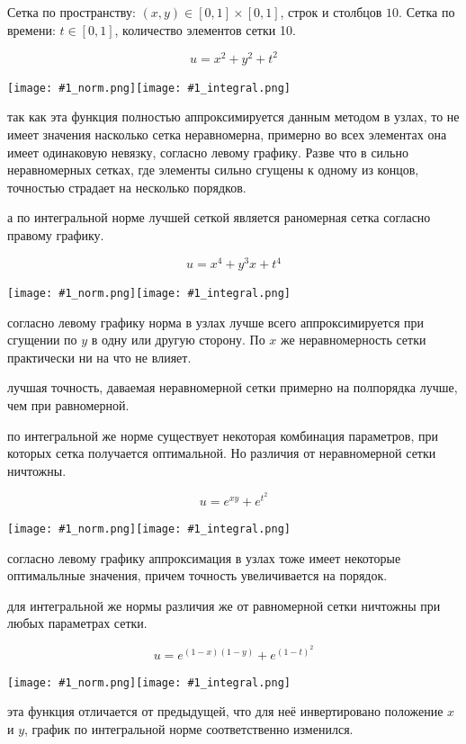 Сетка по пространству: $ (x, y) \in [0, 1] \times [0, 1] $, строк и столбцов $10$. Сетка по времени: $ t \in [0, 1] $, количество элементов сетки 10.

\newcommand{\includetwoimages}[1]{
\noindent\texttt{[image: \#1\_norm.png]}\texttt{[image: \#1\_integral.png]}
}

$$ u = x^2 + y^2 + t^2 $$

\includetwoimages{space_tgrid_0}

\conclusion так как эта функция полностью аппроксимируется данным методом в узлах, то не имеет значения насколько сетка неравномерна, примерно во всех элементах она имеет одинаковую невязку, согласно левому графику. Разве что в сильно неравномерных сетках, где элементы сильно сгущены к одному из концов, точностью страдает на несколько порядков.

\conclusion а по интегральной норме лучшей сеткой является раномерная сетка согласно правому графику.

$$ u = x^4 + y^3x + t^4 $$

\includetwoimages{space_tgrid_1}

\conclusion согласно левому графику норма в узлах лучше всего аппроксимируется при сгущении по $y$ в одну или другую сторону. По $x$ же неравномерность сетки практически ни на что не влияет.

\conclusion лучшая точность, даваемая неравномерной сетки примерно на полпорядка лучше, чем при равномерной.

\conclusion по интегральной же норме существует некоторая комбинация параметров, при которых сетка получается оптимальной. Но различия от неравномерной сетки ничтожны.

$$ u = e^{xy} + e^{t^2} $$

\includetwoimages{space_tgrid_2}

\conclusion согласно левому графику аппроксимация в узлах тоже имеет некоторые оптимальлные значения, причем точность увеличивается на порядок.

\conclusion для интегральной же нормы различия же от равномерной сетки ничтожны при любых параметрах сетки.

$$ u = e^{(1-x)(1-y)} + e^{(1-t)^2} $$

\includetwoimages{space_tgrid_3}

\conclusion эта функция отличается от предыдущей, что для неё инвертировано положение $x$ и $y$, график по интегральной норме соответственно изменился.

